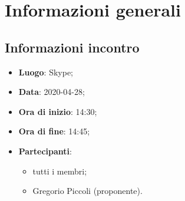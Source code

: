 \section{Informazioni generali}
\subsection{Informazioni incontro}
\begin{itemize}
\item \textbf{Luogo}: Skype;
\item \textbf{Data}: 2020-04-28;
\item \textbf{Ora di inizio}: 14:30;
\item \textbf{Ora di fine}: 14:45;
\item \textbf{Partecipanti}:
	\begin{itemize}
		\item tutti i membri;
		\item Gregorio Piccoli (proponente).
	\end{itemize}
\end{itemize}

